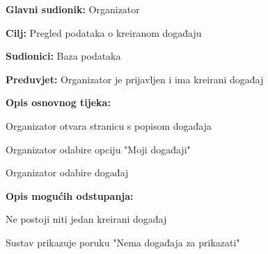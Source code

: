 					\noindent {}
					\begin{packed_item}
	
						\item \textbf{Glavni sudionik:} Organizator
						\item  \textbf{Cilj:} Pregled podataka o kreiranom događaju
						\item  \textbf{Sudionici:} Baza podataka
						\item  \textbf{Preduvjet:} Organizator je prijavljen i ima kreirani događaj
						\item  \textbf{Opis osnovnog tijeka:}
						
						\item[] \begin{packed_enum}
	
							\item Organizator otvara stranicu s popisom događaja
							\item Organizator odabire opciju "Moji događaji"
							\item Organizator odabire događaj

						\end{packed_enum}
						
						\item  \textbf{Opis mogućih odstupanja:}
						
						\item[] \begin{packed_item}
	
							\item[2.a] Ne postoji niti jedan kreirani događaj
							\item[] \begin{packed_enum}
								
								\item Sustav prikazuje poruku "Nema događaja za prikazati"
								
							\end{packed_enum}
							
						\end{packed_item}
					\end{packed_item}


